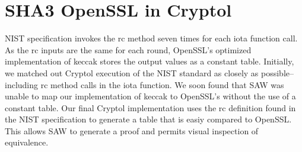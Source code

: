 \section{SHA3 OpenSSL in Cryptol}\label{sec:openssl}
NIST specification invokes the rc method seven times for each iota function call.
As the rc inputs are the same for each round, OpenSSL's optimized implementation of keccak stores 
the output values as a constant table. Initially, we matched out Cryptol execution of the NIST standard 
as closely as possible--including rc method calls in the iota function. We soon found that SAW was unable 
to map our implementation of keccak to OpenSSL's without the use of a constant table.
Our final Cryptol implementation uses the rc definition found in the NIST specification to generate a table 
that is easiy compared to OpenSSL. This allows SAW to generate a proof and permits visual inspection of equivalence.